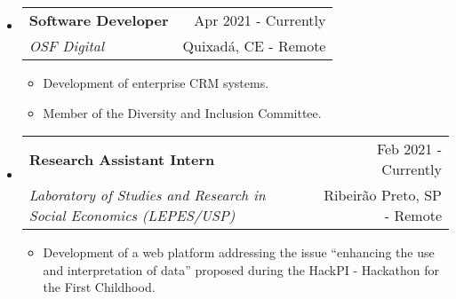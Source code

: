 \documentclass[letterpaper,11pt]{article}
\makeatletter
\newcommand{\resumeSubheading}[4]{
    \vspace{-1pt}\item
        \begin{tabular*}{0.97\textwidth}{l@{\extracolsep{\fill}}r}
            \textbf{#1} & #2 \\
            \textit{\small#3} & \small #4 \\
        \end{tabular*}
    \vspace{-5pt}
}
\newcommand{\resumeSubHeadingListStart}{\begin{itemize}[leftmargin=*]}
\newcommand{\resumeSubHeadingListEnd}{\end{itemize}}
\makeatother
\begin{document}
    \resumeSubHeadingListStart
        \resumeSubheading
        {Software Developer}{\faCalendar \hspace{0.1cm} Apr 2021 - Currently}
        {OSF Digital}{\faMapMarker \hspace{0.1cm} Quixadá, CE - Remote}
        \begin{itemize}
            \item Development of enterprise CRM systems.
            \item Member of the Diversity and Inclusion Committee.
        \end{itemize}
    \resumeSubHeadingListEnd
    
    \vspace{-0.2cm}

        
    
    \resumeSubHeadingListStart
        \resumeSubheading
        {Research Assistant Intern}{\faCalendar \hspace{0.1cm} Feb 2021 - Currently}
        {Laboratory of Studies and Research in Social Economics (LEPES/USP)}{\faMapMarker \hspace{0.1cm} Ribeirão Preto, SP - Remote}
        
        \begin{itemize}
            \item Development of a web platform addressing the issue ``enhancing the use and interpretation of data'' proposed during the HackPI - Hackathon for the First Childhood.
        \end{itemize}
    \resumeSubHeadingListEnd
    
\end{document}
